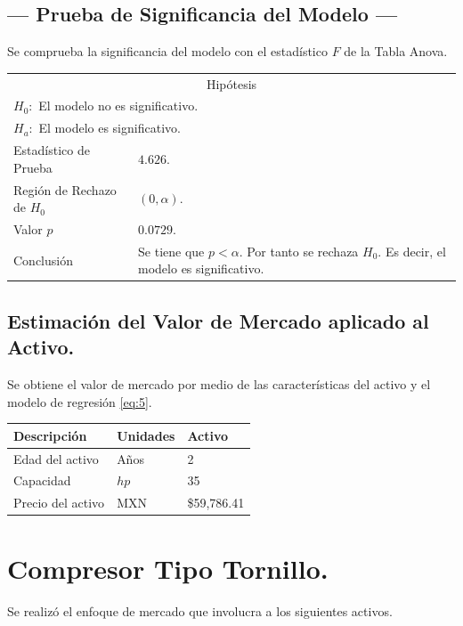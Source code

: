 \subsection{\centering --- Prueba de Significancia del Modelo ---} %
Se comprueba la significancia del modelo con el estadístico \(F\) de la Tabla Anova.
\begin{center}
  \begin{tabular}{|l|p{6cm}|}
    \cline{1-2}
    \multicolumn{2}{|c|}{Hipótesis}\\ \cline{1-2}
    \multicolumn{2}{|l|}{\(H_0:\) El modelo no es significativo.} \\ 
    \multicolumn{2}{|l|}{\(H_a:\) El modelo es significativo.} \\ \cline{1-2}
    Estadístico de Prueba & \(4.626\).\\ \cline{1-2} 
		Región de Rechazo de \(H_0\) & \((0, \alpha )\).\\ \cline{1-2} 
    Valor \(p\) & \(0.0729\).\\ \cline{1-2} 
    Conclusión & Se tiene que \(p<\alpha\). \newline 
		Por tanto se rechaza \(H_0\). \newline 
		Es decir, el modelo es significativo.\\ \cline{1-2} 
  \end{tabular}
\end{center} 

\subsection{\centering Estimación del Valor de Mercado aplicado al Activo.} %
Se obtiene el valor de mercado por medio de las características del activo y el modelo de regresión \eqref{eq:5}.
\begin{center}
  \begin{tabular}{|l|l|l|}
    \hline 
		Descripción   & Unidades  & Activo \\ \hline 
    Edad del activo    & Años      & 2      \\ \hline 
		Capacidad  & \(hp\) & 35   \\ \hline 
		Precio del activo   & MXN       & \$59,786.41   \\ \hline 
  \end{tabular}
\end{center} 

\section{Compresor Tipo Tornillo.} %
Se realizó el enfoque de mercado que involucra a los siguientes activos.

